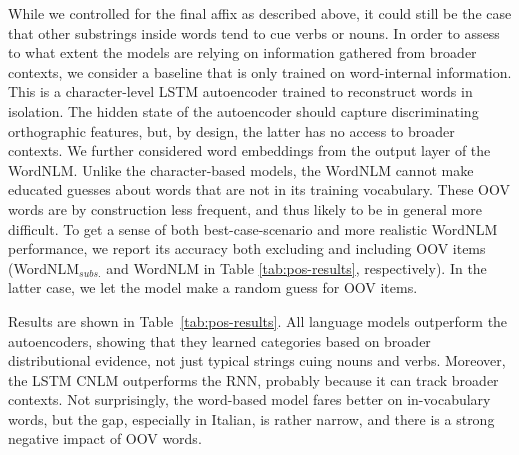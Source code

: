 While we controlled for the final affix as described above, it could
still be the case that other substrings inside words tend to cue verbs
or nouns. In order to assess to what extent the models are relying on
information gathered from broader contexts, we consider a baseline
that is only trained on word-internal information. This is a
character-level LSTM autoencoder trained to reconstruct words in
isolation.  The hidden state of the autoencoder should capture
discriminating orthographic features, but, by design, the latter has
no access to broader contexts.  We further considered word embeddings
from the output layer of the WordNLM. Unlike the character-based
models, the WordNLM cannot make educated guesses about words that are
not in its training vocabulary. These OOV words are by construction
less frequent, and thus likely to be in general more difficult. To get
a sense of both best-case-scenario and more realistic WordNLM
performance, we report its accuracy both excluding and including OOV
items (WordNLM$_{\textit{subs.}}$ and WordNLM in Table
\ref{tab:pos-results}, respectively). In the latter case, we let the
model make a random guess for OOV items.

Results are shown in Table~\ref{tab:pos-results}.  All language models
outperform the autoencoders, showing that they learned categories
based on broader distributional evidence, not just typical strings
cuing nouns and verbs. Moreover, the LSTM CNLM outperforms the RNN,
probably because it can track broader contexts. Not surprisingly, the
word-based model fares better on in-vocabulary words, but the gap,
especially in Italian, is rather narrow, and there is a strong
negative impact of OOV
words. %

